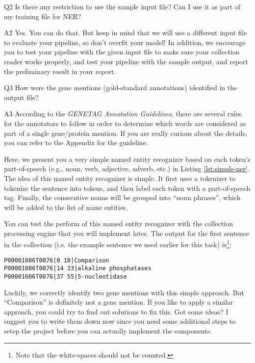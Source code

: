\begin{qa}
\item[Q2] Is there any restriction to use the sample input file? Can I use it
as part of my training file for NER?

\item[A2] Yes. You can do that. But keep in mind that we will use a different
input file to evaluate your pipeline, so don't overfit your model! In addition,
we encourage you to test your pipeline with the given input file to make sure
your collection reader works properly, and test your pipeline with the sample
output, and report the preliminary result in your report.

\item[Q3] How were the gene mentions (gold-standard annotations) identified in
the output file?

\item[A3] According to the \emph{GENETAG Annotation Guidelines}, there are
several rules for the annotators to follow in order to determine which words are
considered as part of a single gene/protein mention. If you are really curious
about the details, you can refer to the Appendix for the guideline.

\end{qa}

Here, we present you a very simple named entity recognizer based on each token's
part-of-speech (e.g., noun, verb, adjective, adverb, etc.) in Listing
\ref{lst:simple-ner}. The idea of this named entity recognizer is simple. It
first uses a tokenizer to tokenize the sentence into tokens, and then label each
token with a part-of-speech tag. Finally, the consecutive nouns will be grouped
into ``noun phrases'', which will be added to the list of name entities.

\small

\normalsize

You can test the perform of this named entity recognizer with the collection
processing engine that you will implement later. The output for the first
sentence in the collection (i.e. the example sentence we used earlier for this
task) is\footnote{Note that the white-spaces should not be counted.}:

\begin{verbatim}
P00001606T0076|0 10|Comparison
P00001606T0076|14 33|alkaline phosphatases
P00001606T0076|37 55|5-nucleotidase
\end{verbatim}

Luckily, we correctly identify two gene mentions with this simple approach. But
``Comparison'' is definitely not a gene mention. If you like to apply a similar
approach, you could try to find out solutions to fix this. Got some ideas? I
suggest you to write them down now since you need some additional steps to setep
the project before you can actually implement the components.
